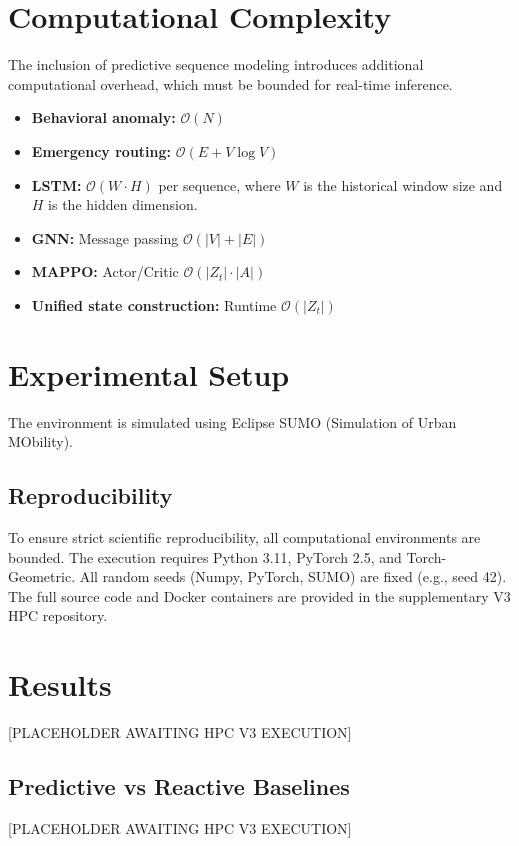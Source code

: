 \documentclass{ieeeaccess}
\begin{document}
\section{Computational Complexity}
\label{sec:complexity}
The inclusion of predictive sequence modeling introduces additional computational overhead, which must be bounded for real-time inference.
\begin{itemize}
    \item \textbf{Behavioral anomaly:} $\mathcal{O}(N)$
    \item \textbf{Emergency routing:} $\mathcal{O}(E + V \log V)$
    \item \textbf{LSTM:} $\mathcal{O}(W \cdot H)$ per sequence, where $W$ is the historical window size and $H$ is the hidden dimension.
    \item \textbf{GNN:} Message passing $\mathcal{O}(|V| + |E|)$
    \item \textbf{MAPPO:} Actor/Critic $\mathcal{O}(|Z_t| \cdot |A|)$
    \item \textbf{Unified state construction:} Runtime $\mathcal{O}(|Z_t|)$
\end{itemize}

\section{Experimental Setup}
\label{sec:experimental_setup}
The environment is simulated using Eclipse SUMO (Simulation of Urban MObility). 
\subsection{Reproducibility}
To ensure strict scientific reproducibility, all computational environments are bounded. The execution requires Python 3.11, PyTorch 2.5, and Torch-Geometric. All random seeds (Numpy, PyTorch, SUMO) are fixed (e.g., seed 42). The full source code and Docker containers are provided in the supplementary V3 HPC repository.

\section{Results}
\label{sec:results}
[PLACEHOLDER AWAITING HPC V3 EXECUTION]

\subsection{Predictive vs Reactive Baselines}
[PLACEHOLDER AWAITING HPC V3 EXECUTION]
\end{document}

